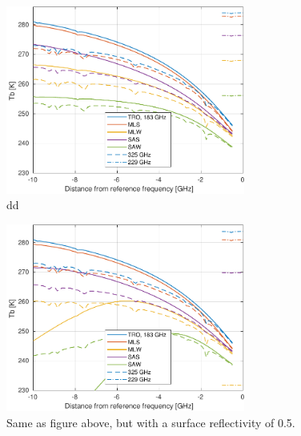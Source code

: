 \documentclass[12pt]{article}
\begin{document}
\begin{figure}[p]
  \centering
  \includegraphics[width=0.7\textwidth]{fascod_tb_r000}
  \caption{dd}
  \label{fig:tb:r00}
\end{figure}
\begin{figure}[p]
  \centering
  \includegraphics[width=0.7\textwidth]{fascod_tb_r050}
  \caption{Same as figure above, but with a surface reflectivity of 0.5.}
  \label{fig:tb:r00}
\end{figure}





\end{document}

